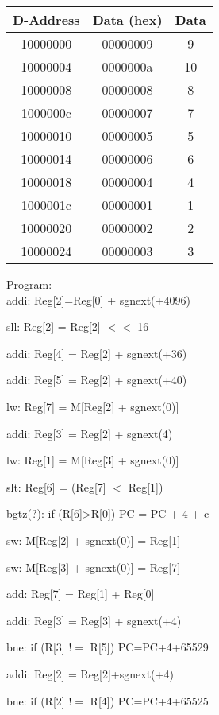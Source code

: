 \documentclass[11pt]{article}   	%
\begin{document}
\begin{table}[!htbp]
\begin{tabular}{|c|c|c|}
\hline
D-Address & Data (hex) & Data \\
\hline
10000000 & 00000009 & 9  \\
\hline
10000004 & 0000000a &  10 \\
\hline
10000008 & 00000008 & 8  \\
\hline
1000000c & 00000007 & 7  \\
\hline
10000010 & 00000005 & 5  \\
\hline
10000014 & 00000006 & 6  \\
\hline
10000018 & 00000004 & 4  \\
\hline
1000001c & 00000001 &  1\\
\hline
10000020 & 00000002 &2  \\
\hline
10000024 & 00000003 &  3 \\
\hline


\end{tabular}
\end{table}


Program:\\

addi: Reg[2]=Reg[0] + sgnext(+4096)

sll: Reg[2] = Reg[2] $<<$ 16

addi: Reg[4] = Reg[2] + sgnext(+36)

addi: Reg[5] = Reg[2] + sgnext(+40)

lw: Reg[7] = M[Reg[2] + sgnext(0)]

addi: Reg[3] = Reg[2] + sgnext(4)

lw: Reg[1] = M[Reg[3] + sgnext(0)]

slt: Reg[6] = (Reg[7] $<$ Reg[1])

bgtz(?): if (R[6]>R[0]) PC = PC + 4 + c

sw: M[Reg[2] + sgnext(0)] = Reg[1]

sw: M[Reg[3] + sgnext(0)] = Reg[7]

add: Reg[7] = Reg[1] + Reg[0]

addi: Reg[3] = Reg[3] + sgnext(+4)

bne: if (R[3] $!=$ R[5]) PC=PC+4+65529

addi: Reg[2] = Reg[2]+sgnext(+4) 

bne:  if (R[2] $!=$ R[4]) PC=PC+4+65525


\vspace{5mm}
\end{document}
